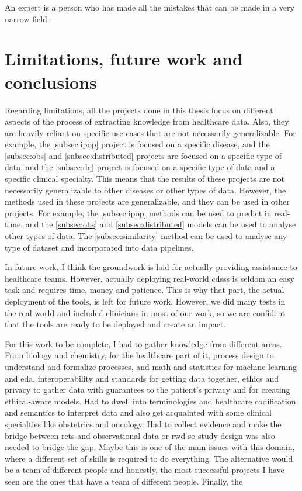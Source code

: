 \begin{savequote}[75mm]
An expert is a person who has made all the mistakes that can be made in a very narrow field.
\end{savequote}
\chapter{Limitations, future work and conclusions} \label{chap:conclusion}

Regarding limitations, all the projects done in this thesis focus on different aspects of the process of extracting knowledge from healthcare data. Also, they are heavily reliant on specific use cases that are not necessarily generalizable. For example, the \ref{subsec:ipop} project is focused on a specific disease, and the \ref{subsec:obs} and \ref{subsec:distributed} projects are focused on a specific type of data, and the \ref{subsec:dq} project is focused on a specific type of data and a specific clinical specialty. This means that the results of these projects are not necessarily generalizable to other diseases or other types of data. However, the methods used in these projects are generalizable, and they can be used in other projects. For example, the \ref{subsec:ipop} methods can be used to predict in real-time, and the \ref{subsec:obs} and \ref{subsec:distributed} models can be used to analyse other types of data. The \ref{subsec:similarity} method can be used to analyse any type of dataset and incorporated into data pipelines.

In future work, I think the groundwork is laid for actually providing assistance to healthcare teams. However, actually deploying real-world \acp{cdss} is seldom an easy task and requires time, money and patience. This is why that part, the actual deployment of the tools, is left for future work. However, we did many tests in the real world and included clinicians in most of our work, so we are confident that the tools are ready to be deployed and create an impact.



For this work to be complete, I had to gather knowledge from different areas. From biology and chemistry, for the healthcare part of it, process design to understand and formalize processes, and math and statistics for machine learning and \ac{eda}, interoperability and standards for getting data together, ethics and privacy to gather data with guarantees to the patient's privacy and for creating ethical-aware models. Had to dwell into terminologies and healthcare codification and semantics to interpret data and also get acquainted with some clinical specialties like obstetrics and oncology. Had to collect evidence and make the bridge between \acp{rct} and observational data or \ac{rwd} so study design was also needed to bridge the gap.
Maybe this is one of the main issues with this domain, where a different set of skills is required to do everything. The alternative would be a team of different people and honestly, the most successful projects I have seen are the ones that have a team of different people.
Finally, the 

